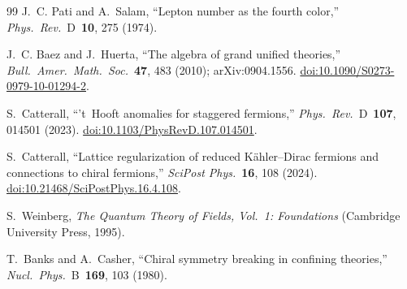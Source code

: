 \documentclass[12pt]{article}
\theoremstyle{remark}
\begin{document}
\begin{thebibliography}{99}
	J.~C. Pati and A.~Salam,
	``Lepton number as the fourth color,''
	\textit{Phys.\ Rev.}\ D~\textbf{10}, 275 (1974).

	J.~C. Baez and J.~Huerta,
	``The algebra of grand unified theories,''
	\textit{Bull.\ Amer.\ Math.\ Soc.}~\textbf{47}, 483 (2010);
	arXiv:0904.1556.
	\href{https://doi.org/10.1090/S0273-0979-10-01294-2}{doi:10.1090/S0273-0979-10-01294-2}.

	S.~Catterall,
	``'t~Hooft anomalies for staggered fermions,''
	\textit{Phys.\ Rev.}\ D~\textbf{107}, 014501 (2023).
	\href{https://doi.org/10.1103/PhysRevD.107.014501}{doi:10.1103/PhysRevD.107.014501}.

	S.~Catterall,
	``Lattice regularization of reduced K\"ahler--Dirac fermions and connections
	to chiral fermions,''
	\textit{SciPost Phys.}~\textbf{16}, 108 (2024).
	\href{https://doi.org/10.21468/SciPostPhys.16.4.108}{doi:10.21468/SciPostPhys.16.4.108}.

	S.~Weinberg,
	\textit{The Quantum Theory of Fields, Vol.~1: Foundations}
	(Cambridge University Press, 1995).

	T.~Banks and A.~Casher,
	``Chiral symmetry breaking in confining theories,''
	\textit{Nucl.\ Phys.}\ B~\textbf{169}, 103 (1980).

\end{thebibliography}
\end{document}
